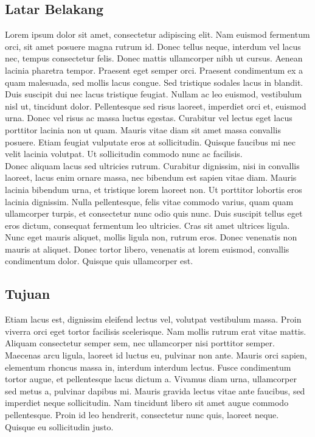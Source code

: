 \documentclass[a4paper,12pt]{article}
\begin{document}
\subsection{Latar Belakang}
Lorem ipsum dolor sit amet, consectetur adipiscing elit. Nam euismod fermentum orci, sit amet posuere magna rutrum id. Donec tellus neque, interdum vel lacus nec, tempus consectetur felis. Donec mattis ullamcorper nibh ut cursus. Aenean lacinia pharetra tempor. Praesent eget semper orci. Praesent condimentum ex a quam malesuada, sed mollis lacus congue. Sed tristique sodales lacus in blandit. Duis suscipit dui nec lacus tristique feugiat. Nullam ac leo euismod, vestibulum nisl ut, tincidunt dolor. Pellentesque sed risus laoreet, imperdiet orci et, euismod urna. Donec vel risus ac massa luctus egestas. Curabitur vel lectus eget lacus porttitor lacinia non ut quam. Mauris vitae diam sit amet massa convallis posuere. Etiam feugiat vulputate eros at sollicitudin. Quisque faucibus mi nec velit lacinia volutpat. Ut sollicitudin commodo nunc ac facilisis.\\
Donec aliquam lacus sed ultricies rutrum. Curabitur dignissim, nisi in convallis laoreet, lacus enim ornare massa, nec bibendum est sapien vitae diam. Mauris lacinia bibendum urna, et tristique lorem laoreet non. Ut porttitor lobortis eros lacinia dignissim. Nulla pellentesque, felis vitae commodo varius, quam quam ullamcorper turpis, et consectetur nunc odio quis nunc. Duis suscipit tellus eget eros dictum, consequat fermentum leo ultricies. Cras sit amet ultrices ligula. Nunc eget mauris aliquet, mollis ligula non, rutrum eros. Donec venenatis non mauris at aliquet. Donec tortor libero, venenatis at lorem euismod, convallis condimentum dolor. Quisque quis ullamcorper est.

\subsection{Tujuan}
Etiam lacus est, dignissim eleifend lectus vel, volutpat vestibulum massa. Proin viverra orci eget tortor facilisis scelerisque. Nam mollis rutrum erat vitae mattis. Aliquam consectetur semper sem, nec ullamcorper nisi porttitor semper. Maecenas arcu ligula, laoreet id luctus eu, pulvinar non ante. Mauris orci sapien, elementum rhoncus massa in, interdum interdum lectus. Fusce condimentum tortor augue, et pellentesque lacus dictum a. Vivamus diam urna, ullamcorper sed metus a, pulvinar dapibus mi. Mauris gravida lectus vitae ante faucibus, sed imperdiet neque sollicitudin. Nam tincidunt libero sit amet augue commodo pellentesque. Proin id leo hendrerit, consectetur nunc quis, laoreet neque. Quisque eu sollicitudin justo.
\end{document}
